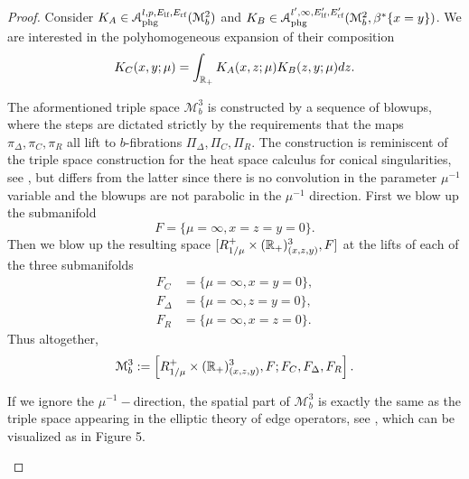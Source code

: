 \begin{proof}
Consider $K_A \in \mathscr{A}_{\textup{phg}}^{l,p,E_{\textup{lf}}, E_{\textup{rf}}}(\mathscr{M}^2_b)$ 
and $K_B \in \mathscr{A}_{\textup{phg}}^{l',\infty,E'_{\textup{lf}}, E'_{\textup{rf}}}(\mathscr{M}^2_b,\beta^*\{x=y\})$. 
We are interested in the polyhomogeneous expansion of their composition
\[
K_C (x,y;\mu) = \int_{\R_+} K_A(x,z;\mu) K_B(z,y;\mu) dz.
\]

The aformentioned triple space $\mathscr{M}^3_b$ is constructed by a sequence of blowups,
where the steps are dictated strictly by the requirements that the maps
$\pi_\Delta, \pi_C, \pi_R$ all lift to $b$-fibrations $\Pi_\Delta, \Pi_C, \Pi_R$. The construction 
is reminiscent of the triple space construction for the heat space calculus for conical 
singularities, see \cite{Moo:HKA}, but differs from the latter since there is no convolution 
in the parameter $\mu^{-1}$ variable and the blowups are not parabolic in the $\mu^{-1}$
direction. First we blow up the submanifold
\[
F=\{\mu = \infty, x=z=y=0\}.
\]
Then we blow up the resulting space $[R^+_{1/\mu}\times (\R_+)^3_{(x,z,y)}, F]$ at the 
lifts of each of the three submanifolds
\begin{equation}
\begin{split}
F_C&=\{\mu = \infty, x=y=0\}, \\
F_\Delta&=\{\mu = \infty, z=y=0\}, \\
F_R&=\{\mu = \infty, x=z=0\}.
\end{split}
\end{equation} 
Thus altogether,
\[
\mathscr{M}^3_b := \left[R^+_{1/\mu}\times (\R_+)^3_{(x,z,y)}, F; F_C, F_\Delta, F_R\right].
\]

If we ignore the $\mu^{-1}-$direction, the spatial part of $\mathscr{M}^3_b$ is 
exactly the same as the triple space appearing in the elliptic theory of edge operators, 
see \cite{Maz:ETO}, which can be visualized as in Figure 5.
\begin{figure}[h]
\begin{center}
\end{center}
\end{figure}
\end{proof}

